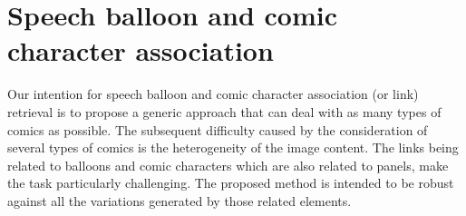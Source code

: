 \documentclass[conference]{IEEEtran}
\begin{document}


\section{Speech balloon and comic character association}
\label{sec:balloon_character_association}

Our intention for speech balloon and comic character association (or link) retrieval is to propose a generic approach that can deal with as many types of comics as possible.
The subsequent difficulty caused by the consideration of several types of comics is the heterogeneity of the image content.
The links being related to balloons and comic characters which are also related to panels, make the task particularly challenging.
The proposed method is intended to be robust against all the variations generated by those related elements.
\end{document}
